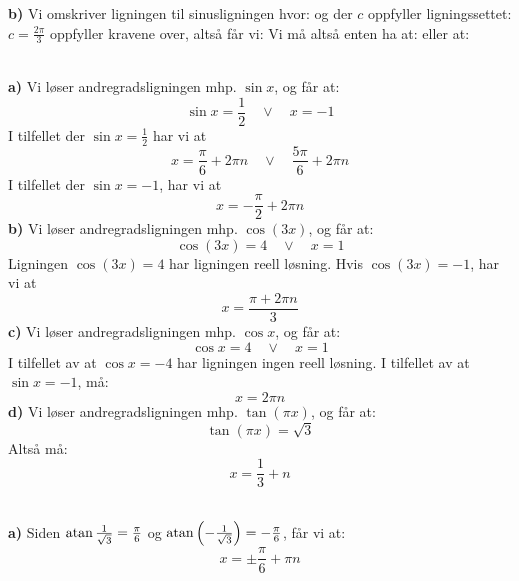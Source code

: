 \textbf{b)} Vi omskriver ligningen til sinusligningen
hvor:
og der $ c $ oppfyller ligningssettet:
$ c=\frac{2\pi}{3} $ oppfyller kravene over, altså får vi:
Vi må altså enten ha at:
eller at:

\\
\textbf{a)} Vi løser andregradsligningen mhp. $ \sin x $, og får at:
\[ \sin x = \frac{1}{2}\quad\vee\quad x= -1 \]
I tilfellet der $ {\sin x = \frac{1}{2}} $ har vi at
\[ x = \frac{\pi}{6}+2\pi n\quad\vee\quad \frac{5\pi}{6}+2\pi n \]
I tilfellet der $ {\sin x = -1} $, har vi at
\[ x = -\frac{\pi}{2}+2\pi n\]
\textbf{b)} Vi løser andregradsligningen mhp. $ \cos (3x) $, og får at:
\[ \cos (3x) = 4\quad\vee\quad x= 1 \]
Ligningen $ {\cos (3x) = 4} $ har ligningen reell løsning. Hvis $ {\cos (3x) = -1} $, har vi at
\[ x = \frac{\pi +2\pi n}{3}\]
\textbf{c)} Vi løser andregradsligningen mhp. $ \cos x $, og får at:
\[ \cos x = 4\quad\vee\quad x= 1 \]
I tilfellet av at $ {\cos x = -4} $ har ligningen ingen reell løsning. I tilfellet av at $ {\sin x = -1} $, må:
\[ x = 2\pi n\]
\textbf{d)} Vi løser andregradsligningen mhp. $ \tan(\pi x) $, og får at:
\[ \tan(\pi x) = \sqrt{3}\]
Altså må:
\[ x = \frac{1}{3}+n\]

\\
\textbf{a)} 
Siden $ {\operatorname{atan} \frac{1}{\sqrt{3}}=\frac{\pi}{6}} $ og $ {\operatorname{atan} \left(-\frac{1}{\sqrt{3}}\right)=-\frac{\pi}{6}} $, får vi at:
\[ x = \pm \frac{\pi}{6}+\pi n \]

